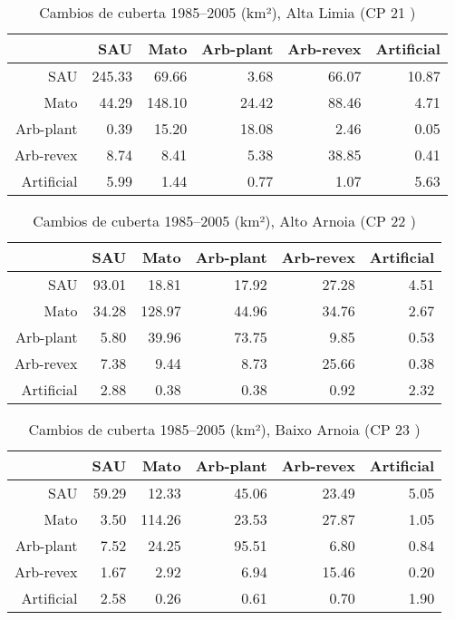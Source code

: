 \clearpage
\begin{table}[p]
\centering
\caption{Cambios de cuberta 1985--2005 (km²), Alta Limia (CP 21 )} 
\label{TaboaContinxCP21}
\begin{tabular}{rrrrrr}
  \hline
 & SAU & Mato & Arb-plant & Arb-revex & Artificial \\ 
  \hline
SAU & 245.33 & 69.66 & 3.68 & 66.07 & 10.87 \\ 
  Mato & 44.29 & 148.10 & 24.42 & 88.46 & 4.71 \\ 
  Arb-plant & 0.39 & 15.20 & 18.08 & 2.46 & 0.05 \\ 
  Arb-revex & 8.74 & 8.41 & 5.38 & 38.85 & 0.41 \\ 
  Artificial & 5.99 & 1.44 & 0.77 & 1.07 & 5.63 \\ 
   \hline
\end{tabular}
\end{table}
\begin{table}[p]
\centering
\caption{Cambios de cuberta 1985--2005 (km²), Alto Arnoia (CP 22 )} 
\label{TaboaContinxCP22}
\begin{tabular}{rrrrrr}
  \hline
 & SAU & Mato & Arb-plant & Arb-revex & Artificial \\ 
  \hline
SAU & 93.01 & 18.81 & 17.92 & 27.28 & 4.51 \\ 
  Mato & 34.28 & 128.97 & 44.96 & 34.76 & 2.67 \\ 
  Arb-plant & 5.80 & 39.96 & 73.75 & 9.85 & 0.53 \\ 
  Arb-revex & 7.38 & 9.44 & 8.73 & 25.66 & 0.38 \\ 
  Artificial & 2.88 & 0.38 & 0.38 & 0.92 & 2.32 \\ 
   \hline
\end{tabular}
\end{table}
\begin{table}[p]
\centering
\caption{Cambios de cuberta 1985--2005 (km²), Baixo Arnoia (CP 23 )} 
\label{TaboaContinxCP23}
\begin{tabular}{rrrrrr}
  \hline
 & SAU & Mato & Arb-plant & Arb-revex & Artificial \\ 
  \hline
SAU & 59.29 & 12.33 & 45.06 & 23.49 & 5.05 \\ 
  Mato & 3.50 & 114.26 & 23.53 & 27.87 & 1.05 \\ 
  Arb-plant & 7.52 & 24.25 & 95.51 & 6.80 & 0.84 \\ 
  Arb-revex & 1.67 & 2.92 & 6.94 & 15.46 & 0.20 \\ 
  Artificial & 2.58 & 0.26 & 0.61 & 0.70 & 1.90 \\ 
   \hline
\end{tabular}
\end{table}
